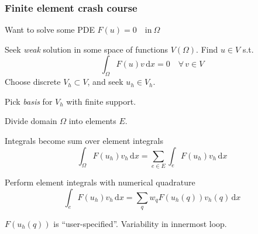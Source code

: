 \documentclass[presentation]{beamer}
\begin{document}
\begin{frame}[allowframebreaks]
  \frametitle{Finite element crash course}
  Want to solve some PDE $F(u) = 0 \quad \text{in}\:\Omega$

  Seek \emph{weak} solution in some space of functions $V(\Omega)$.  Find $u\in
  V$ s.t.
\begin{equation*}
\int_\Omega \!F(u) v\, \text{d}x = 0 \quad \forall\, v \in V
\end{equation*}
Choose discrete $V_h \subset V$, and seek $u_h \in V_h$.

Pick \emph{basis} for $V_h$ with finite support.

\pagebreak
Divide domain $\Omega$ into elements $E$.

Integrals become sum over element integrals
\begin{equation*}
\int_\Omega\! F(u_h) v_h \, \text{d}x = \sum_{e \in E} \int_e\! F(u_h)v_h\, \text{d}x
\end{equation*}

Perform element integrals with numerical quadrature
\begin{equation*}
  \int_e F(u_h)v_h\,\text{d}x = \sum_q w_q F(u_h(q)) v_h(q)\,\text{d}x
\end{equation*}

$F(u_h(q))$ is ``user-specified''.  Variability in innermost loop.
\end{frame}
\end{document}

